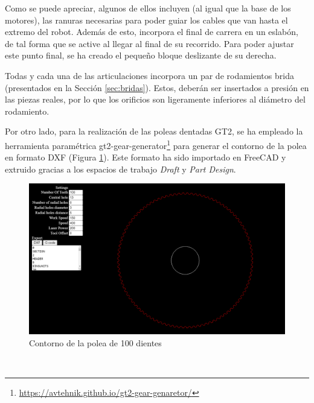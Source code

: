 Como se puede apreciar, algunos de ellos incluyen (al igual que la base de los motores), las ranuras necesarias para poder guiar los cables que van hasta el extremo del 
robot. Además de esto, incorpora el final de carrera en un eslabón, de tal forma que se active al llegar al final de su recorrido. Para poder 
ajustar este punto final, se ha creado el pequeño bloque deslizante de su derecha.

Todas y cada una de las articulaciones incorpora un par de rodamientos brida (presentados en la Sección \ref{sec:bridas}). Estos, deberán ser insertados a 
presión en las piezas reales, por lo que los orificios son ligeramente inferiores al diámetro del rodamiento.

Por otro lado, para la realización de las poleas dentadas GT2, se ha empleado la herramienta paramétrica 
gt2-gear-generator\footnote{\url{https://avtehnik.github.io/gt2-gear-genaretor/}} para generar el contorno de la polea en formato DXF 
(Figura \ref{fig:polea_dxf}). Este formato 
ha sido importado en FreeCAD y extruido gracias a los espacios de trabajo \textit{Draft} y \textit{Part Design}.
\begin{figure} [ht!]
  \begin{center}
    \includegraphics[width=14cm]{figs/dxf_polea.png}
  \end{center}
  \caption{Contorno de la polea de 100 dientes}
  \label{fig:polea_dxf}
\end{figure}\ 


